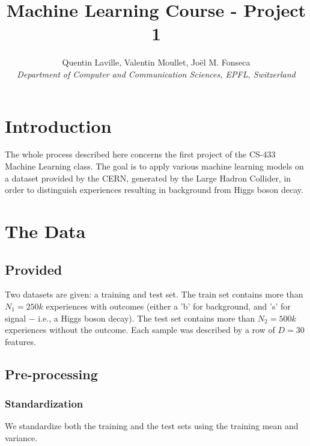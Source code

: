 \documentclass[10pt,conference,compsocconf]{IEEEtran}
\begin{document}
\title{Machine Learning Course - Project 1}

\author{
  Quentin Laville, Valentin Moullet, Joël M. Fonseca\\
  \textit{Department of Computer and Communication Sciences, EPFL, Switzerland}
}

\maketitle

\section{Introduction}

The whole process described here concerns the first project of the CS-433 Machine Learning class. The goal is to apply various machine learning models on a dataset provided by the CERN, generated by the Large Hadron Collider, in order to distinguish experiences resulting in background from Higgs boson decay.

\section{The Data}

\subsection{Provided}

Two datasets are given: a training and test set. The train set contains more than $N_1 = 250k$ experiences with outcomes (either a 'b' for background, and 's' for signal $-$ i.e., a Higgs boson decay). The test set contains more than $N_2 = 500k$ experiences without the outcome. Each sample was described by a row of $D = 30$ features.

\subsection{Pre-processing}

\subsubsection{Standardization}

We standardize both the training and the test sets using the training mean and variance.
\end{document}
